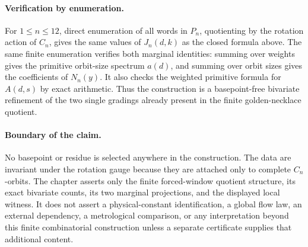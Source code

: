 \paragraph{Verification by enumeration.}
For $1\leq n\leq 12$, direct enumeration of all words in $P_n$, quotienting by the rotation action of $C_n$, gives the same values of $J_n(d,k)$ as the closed formula above. The same finite enumeration verifies both marginal identities: summing over weights gives the primitive orbit-size spectrum $a(d)$, and summing over orbit sizes gives the coefficients of $N_n(y)$. It also checks the weighted primitive formula for $A(d,s)$ by exact arithmetic. Thus the construction is a basepoint-free bivariate refinement of the two single gradings already present in the finite golden-necklace quotient.

\paragraph{Boundary of the claim.}
No basepoint or residue is selected anywhere in the construction. The data are invariant under the rotation gauge because they are attached only to complete $C_n$-orbits. The chapter asserts only the finite forced-window quotient structure, its exact bivariate counts, its two marginal projections, and the displayed local witness. It does not assert a physical-constant identification, a global flow law, an external dependency, a metrological comparison, or any interpretation beyond this finite combinatorial construction unless a separate certificate supplies that additional content.
